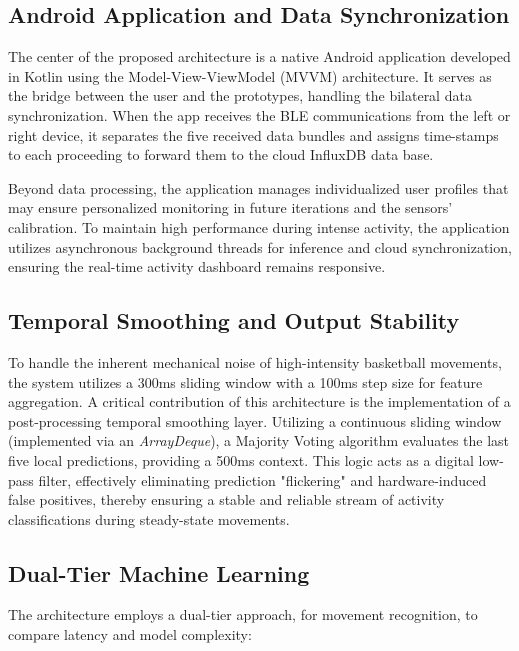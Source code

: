 \documentclass[conference]{IEEEtran}
\begin{document}
\subsection{Android Application and Data Synchronization}

The center of the proposed architecture is a native Android application developed in Kotlin using the Model-View-ViewModel (MVVM) architecture. It serves as the bridge between the user and the prototypes, handling 
the bilateral data synchronization. When the app receives the BLE communications from the left or right device, it separates the five received data bundles and assigns time-stamps to each proceeding to forward them 
to the cloud InfluxDB data base.

Beyond data processing, the application manages individualized user profiles that may ensure personalized monitoring in future iterations and the sensors' calibration. To maintain high performance during intense 
activity, the application utilizes asynchronous background threads for inference and cloud synchronization, ensuring the real-time activity dashboard remains responsive.

\subsection{Temporal Smoothing and Output Stability}

To handle the inherent mechanical noise of high-intensity basketball movements, the system utilizes a 300ms sliding window with a 100ms step size for feature aggregation. A critical contribution of this 
architecture is the implementation of a post-processing temporal smoothing layer. Utilizing a continuous sliding window (implemented via an \textit{ArrayDeque}), a Majority Voting algorithm evaluates the last five 
local predictions, providing a 500ms context. This logic acts as a digital low-pass filter, effectively eliminating prediction "flickering" and hardware-induced false positives, thereby ensuring a stable and 
reliable stream of activity classifications during steady-state movements.


\subsection{Dual-Tier Machine Learning}

The architecture employs a dual-tier approach, for movement recognition, to compare latency and model complexity:
\end{document}

